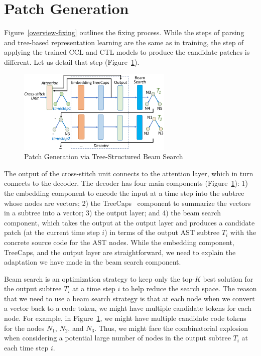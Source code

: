 \section{Patch Generation}
\label{sec:patch-gen}

Figure~\ref{overview-fixing} outlines the fixing process. While the
steps of parsing and tree-based representation learning are the same
as in training, the step of applying the trained CCL and
CTL models to produce the candidate patches is different. Let us
detail that step (Figure~\ref{fig:patch-gen}).

\begin{figure}[t]
	\centering
	\includegraphics[width=2.9in]{graphs/beam-search.png}
        \vspace{-9pt}
	\caption{Patch Generation via Tree-Structured Beam Search}
	\label{fig:patch-gen}
\end{figure}

The output of the cross-stitch unit connects to the attention layer,
which in turn connects to the decoder. The decoder has four main
components (Figure~\ref{fig:patch-gen}): 1) the embedding
component to encode the input at a time step into the subtree whose
nodes are vectors; 2) the TreeCaps~\cite{bui2021treecaps} component to
summarize the vectors in a subtree into a vector; 3) the output layer;
and 4) the beam search component, which takes the output at the output
layer and produces a candidate patch (at the current time step $i$) in
terms of the output AST subtree $T_i$ with the concrete source code
for the AST nodes. While the embedding component, TreeCaps, and the
output layer are straightforward, we need to explain the adaptation we
have made in the beam search component.

Beam search is an optimization strategy to keep only the top-$K$ best
solution for the output subtree $T_i$ at a time step $i$ to help
reduce the search space. The reason that we need to use a beam search
strategy is that at each node when we convert a vector back to a code
token, we might have multiple candidate tokens for each node. For
example, in Figure~\ref{fig:patch-gen}, we might have multiple
candidate code tokens for the nodes $N_1$, $N_2$, and $N_3$. Thus, we
might face the combinatorial explosion when considering a potential
large number of nodes in the output subtree $T_i$ at each time step
$i$.


